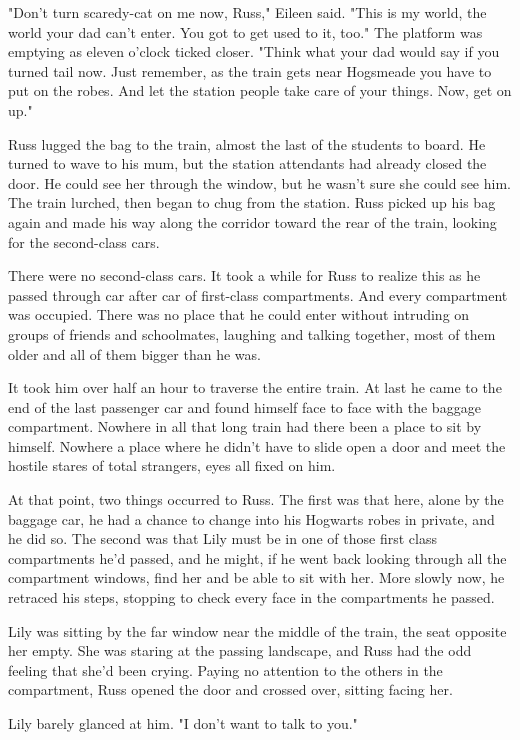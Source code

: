 "Don't turn scaredy-cat on me now, Russ," Eileen said. "This is my world, the world your dad can't enter. You got to get used to it, too." The platform was emptying as eleven o'clock ticked closer. "Think what your dad would say if you turned tail now. Just remember, as the train gets near Hogsmeade you have to put on the robes. And let the station people take care of your things. Now, get on up."

Russ lugged the bag to the train, almost the last of the students to board. He turned to wave to his mum, but the station attendants had already closed the door. He could see her through the window, but he wasn't sure she could see him. The train lurched, then began to chug from the station. Russ picked up his bag again and made his way along the corridor toward the rear of the train, looking for the second-class cars.

There were no second-class cars. It took a while for Russ to realize this as he passed through car after car of first-class compartments. And every compartment was occupied. There was no place that he could enter without intruding on groups of friends and schoolmates, laughing and talking together, most of them older and all of them bigger than he was.

It took him over half an hour to traverse the entire train. At last he came to the end of the last passenger car and found himself face to face with the baggage compartment. Nowhere in all that long train had there been a place to sit by himself. Nowhere a place where he didn't have to slide open a door and meet the hostile stares of total strangers, eyes all fixed on him.

At that point, two things occurred to Russ. The first was that here, alone by the baggage car, he had a chance to change into his Hogwarts robes in private, and he did so. The second was that Lily must be in one of those first class compartments he'd passed, and he might, if he went back looking through all the compartment windows, find her and be able to sit with her. More slowly now, he retraced his steps, stopping to check every face in the compartments he passed.

Lily was sitting by the far window near the middle of the train, the seat opposite her empty. She was staring at the passing landscape, and Russ had the odd feeling that she'd been crying. Paying no attention to the others in the compartment, Russ opened the door and crossed over, sitting facing her.

Lily barely glanced at him. "I don't want to talk to you."

